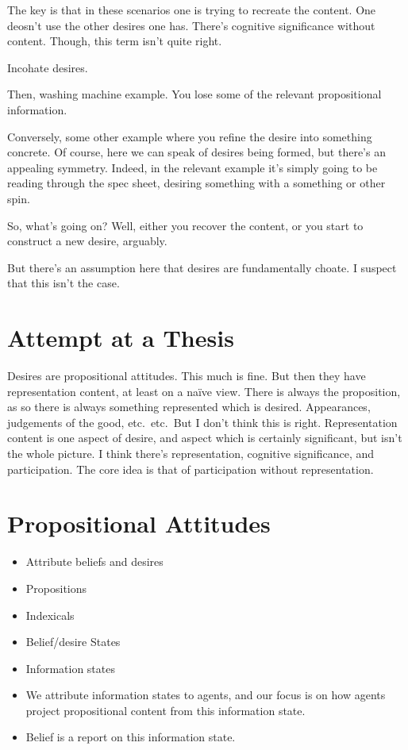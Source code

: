 \documentclass[10pt]{article}
\begin{document}
The key is that in these scenarios one is trying to recreate the content.
One deosn't use the other desires one has.
There's cognitive significance without content.
Though, this term isn't quite right.

Incohate desires.

Then, washing machine example.
You lose some of the relevant propositional information.

Conversely, some other example where you refine the desire into something concrete.
Of course, here we can speak of desires being formed, but there's an appealing symmetry.
Indeed, in the relevant example it's simply going to be reading through the spec sheet, desiring something with a something or other spin.


So, what's going on?
Well, either you recover the content, or you start to construct a new desire, arguably.

But there's an assumption here that desires are fundamentally choate.
I suspect that this isn't the case.






\section{Attempt at a Thesis}
\label{sec:attempt-at-thesis}

Desires are propositional attitudes.
This much is fine.
But then they have representation content, at least on a na\"{i}ve view.
There is always the proposition, as so there is always something represented which is desired.
Appearances, judgements of the good, etc.\ etc.\
But I don't think this is right.
Representation content is one aspect of desire, and aspect which is certainly significant, but isn't the whole picture.
I think there's representation, cognitive significance, and participation.
The core idea is that of participation without representation.



\section{Propositional Attitudes}
\label{sec:prop-attit}


\begin{itemize}
\item Attribute beliefs and desires
\item Propositions
\item Indexicals
\item Belief/desire States
\item Information states
\item We attribute information states to agents, and our focus is on how agents project propositional content from this information state.
\item Belief is a report on this information state.
\end{itemize}
\end{document}

